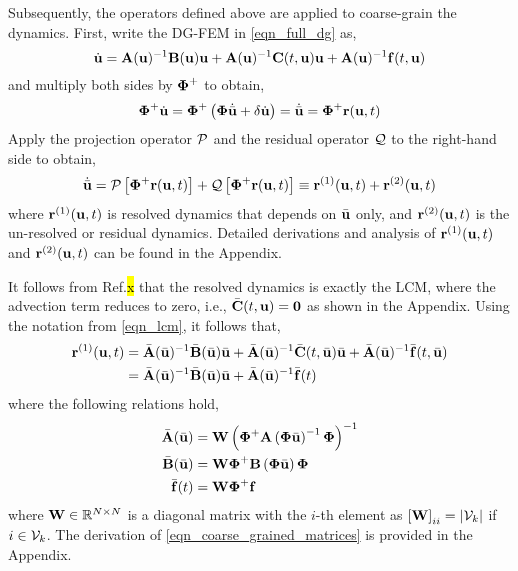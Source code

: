 Subsequently, the operators defined above are applied to coarse-grain the dynamics. First, write the DG-FEM in \cref{eqn_full_dg} as,
\begin{equation}
    \dot{\mathbf{u}} = \mathbf{A}(\mathbf{u})^{-1}\mathbf{B}(\mathbf{u})\mathbf{u} + \mathbf{A}(\mathbf{u})^{-1}\mathbf{C}(t,\mathbf{u})\mathbf{u} + \mathbf{A}(\mathbf{u})^{-1}\mathbf{f}(t,\mathbf{u})\label{eqn_full_dg_rearranged}
\end{equation}
and multiply both sides by $\boldsymbol{\Phi}^{+}$ to obtain,
\begin{equation}
    \boldsymbol{\Phi}^{+}\dot{\mathbf{u}} = \boldsymbol{\Phi}^{+}\left(\boldsymbol{\Phi}\dot{\bar{\mathbf{u}}} + \delta\dot{\mathbf{u}}\right) = \dot{\bar{\mathbf{u}}} = \boldsymbol{\Phi}^{+}\mathbf{r}(\mathbf{u},t)
\end{equation}
Apply the projection operator $\mathcal{P}$ and the residual operator $\mathcal{Q}$ to the right-hand side to obtain,
\begin{equation}
    \dot{\bar{\mathbf{u}}} = \mathcal{P}\left[\boldsymbol{\Phi}^{+}\mathbf{r}(\mathbf{u},t)\right] + \mathcal{Q}\left[\boldsymbol{\Phi}^{+}\mathbf{r}(\mathbf{u},t)\right]\equiv \mathbf{r}^{(1)}(\mathbf{u},t) + \mathbf{r}^{(2)}(\mathbf{u},t)\label{eqn_coarse_grained_dynamics}
\end{equation}
where $\mathbf{r}^{(1)}(\mathbf{u},t)$ is resolved dynamics that depends on $\bar{\mathbf{u}}$ only, and $\mathbf{r}^{(2)}(\mathbf{u},t)$ is the un-resolved or residual dynamics. Detailed derivations and analysis of $\mathbf{r}^{(1)}(\mathbf{u},t)$ and $\mathbf{r}^{(2)}(\mathbf{u},t)$ can be found in the Appendix. 

It follows from Ref.\hl{x} that the resolved dynamics is exactly the LCM, where the advection term reduces to zero, i.e., $\bar{\mathbf{C}}(t,\mathbf{u}) = \boldsymbol{0}$ as shown in the Appendix. Using the notation from \cref{eqn_lcm}, it follows that,
\begin{align}
    \mathbf{r}^{(1)}(\mathbf{u},t) &= \bar{\mathbf{A}}(\bar{\mathbf{u}})^{-1}\bar{\mathbf{B}}(\bar{\mathbf{u}})\bar{\mathbf{u}} + \bar{\mathbf{A}}(\bar{\mathbf{u}})^{-1}\bar{\mathbf{C}}(t,\bar{\mathbf{u}})\bar{\mathbf{u}} + \bar{\mathbf{A}}(\bar{\mathbf{u}})^{-1}\bar{\mathbf{f}}(t,\bar{\mathbf{u}})\notag\\
    &= \bar{\mathbf{A}}(\bar{\mathbf{u}})^{-1}\bar{\mathbf{B}}(\bar{\mathbf{u}})\bar{\mathbf{u}} + \bar{\mathbf{A}}(\bar{\mathbf{u}})^{-1}\bar{\mathbf{f}}(t)\label{eqn_resolved_dynamics_no_advection}
\end{align}
where the following relations hold,
\begin{subequations}
    \begin{align}
        \bar{\mathbf{A}}(\bar{\mathbf{u}}) &= \mathbf{W}\left(\boldsymbol{\Phi}^{+}\mathbf{A}\left(\boldsymbol{\Phi}\bar{\mathbf{u}}\right)^{-1}\boldsymbol{\Phi}\right)^{-1}\\
        \bar{\mathbf{B}}(\bar{\mathbf{u}}) &= \mathbf{W}\boldsymbol{\Phi}^{+}\mathbf{B}\left(\boldsymbol{\Phi}\bar{\mathbf{u}}\right)\boldsymbol{\Phi}\\
        \bar{\mathbf{f}}(t) &= \mathbf{W}\boldsymbol{\Phi}^{+}\mathbf{f}
    \end{align}\label{eqn_coarse_grained_matrices}
\end{subequations}
where $\mathbf{W}\in\mathbb{R}^{N\times N}$ is a diagonal matrix with the $i$-th element as $\left[\mathbf{W}\right]_{ii} = \left|\mathcal{V}_k\right|$ if $i\in\mathcal{V}_k$. The derivation of \cref{eqn_coarse_grained_matrices} is provided in the Appendix.

